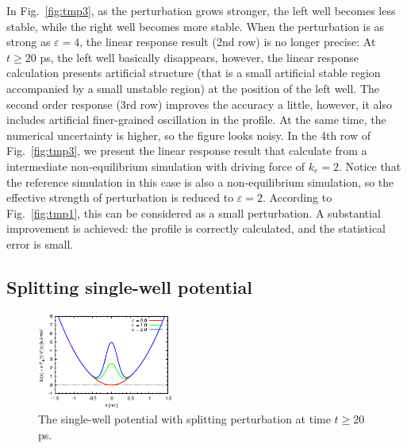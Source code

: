 \documentclass[aip,jcp,a4paper,reprint,onecolumn]{revtex4-1}
\newcommand{\eps}{\varepsilon}
\begin{document}
In Fig.~\ref{fig:tmp3}, as the
perturbation grows stronger, the left well becomes less stable, while
the right well becomes more stable.  When the perturbation is as strong as
$\eps = 4$, the linear response result (2nd row) is no
longer precise:
At $t\geq 20$ \textsf{ps}, the left well basically
disappears, however, the linear response calculation presents
artificial structure (that is a small artificial
stable region accompanied by a small unstable region)
at the position of the left well.
The second order response (3rd row) improves the accuracy a little, 
however, it also includes artificial finer-grained oscillation in the profile.
At the same time, the numerical uncertainty is higher, so the figure
looks noisy.
In the 4th row of Fig.~\ref{fig:tmp3}, we present the linear response result
that calculate from 
a intermediate
non-equilibrium simulation with driving force of $k_e = 2$.
Notice that the reference simulation in this case is also a
non-equilibrium simulation, so the effective strength of perturbation
is reduced to $\eps = 2$. According to Fig.~\ref{fig:tmp1}, this can be
considered as a small perturbation.
A substantial improvement is achieved: the profile
is correctly calculated, and the statistical error is small.



\subsection{Splitting single-well potential}

\begin{figure}
  \centering
  \includegraphics[width=0.4\textwidth]{figs/fig-split-pot.eps}
  \caption{The single-well potential with splitting perturbation at
    time $t\geq 20$ ps.}
  \label{fig:tmp4}
\end{figure}
\end{document}
